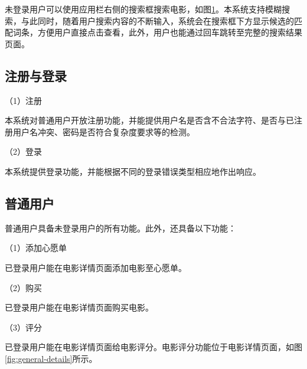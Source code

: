 \documentclass{bjfuthesis}
\begin{document}
未登录用户可以使用应用栏右侧的搜索框搜索电影，如图\ref{fig:anonymous-search}。本系统支持模糊搜索，与此同时，随着用户搜索内容的不断输入，系统会在搜索框下方显示候选的匹配词条，方便用户直接点击查看，此外，用户也能通过回车跳转至完整的搜索结果页面。
\begin{figure}
	\label{fig:anonymous-search}
\end{figure}
\subsection{注册与登录}
\noindent（1）注册

本系统对普通用户开放注册功能，并能提供用户名是否含不合法字符、是否与已注册用户名冲突、密码是否符合复杂度要求等的检测。

\noindent （2）登录

本系统提供登录功能，并能根据不同的登录错误类型相应地作出响应。
\subsection{普通用户}
普通用户具备未登录用户的所有功能。此外，还具备以下功能：

\noindent （1）添加心愿单

已登录用户能在电影详情页面添加电影至心愿单。

\noindent （2）购买

已登录用户能在电影详情页面购买电影。

\noindent （3）评分

已登录用户能在电影详情页面给电影评分。电影评分功能位于电影详情页面，如图\ref{fig:general-details}所示。
\end{document}
